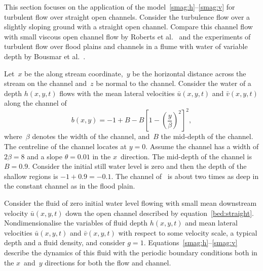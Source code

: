 \documentclass[a5paper,12pt]{article}
\newcommand{\uu}{{\bar u}}
\newcommand{\vv}{{\bar v}}
\begin{document}
This section focuses on the application of the model~\eqref{smag:h}--\eqref{smag:v} for turbulent flow over straight open channels. 
Consider the turbulence flow over a slightly sloping ground with a straight open channel. 
Compare this channel flow with small viscous open channel flow by Roberts et al.~\cite{Robertsli2006} and the experiments of turbulent flow over flood plains and channels in a flume with water of variable depth by Bousmar et al.~\cite{Bousmar2002,Bousmar2003a}. 
 
 Let~$x$ be the along stream coordinate,~$y$ be the horizontal distance across the stream on the channel and~$z$ be normal to the channel. 
Consider the water of a depth $h(x,y,t)$ flows with the mean lateral velocities $\uu(x,y,t)$ and $\vv(x,y,t)$ along the channel of
\begin{equation}
b(x,y)=-1+B-B\left[1-\left(\frac{y}{\beta}\right)^2\right]^2,\label{bed:straight}
\end{equation}
where~$\beta$ denotes the width of the channel, and~$B$ the mid-depth of the channel.  
The centreline of the channel locates at $y=0$.
Assume the channel has a width of  $2\beta=8$ and a slope $\theta=0.01$ in the $x$~direction.  
The mid-depth of the channel is $B=0.9$.
Consider the initial still water level is zero and then the depth of the shallow regions is $-1+0.9=-0.1$.
The channel of~\cite{Bousmar2002} is about two times as deep in the constant channel as in the flood plain.

Consider the fluid of zero initial water level flowing with small mean downstream velocity $\uu(x,y,t)$ down the open channel described by equation~\eqref{bed:straight}. 
Nondimensionalise the variables of fluid depth $h(x,y,t)$ and mean lateral velocities $\uu(x,y,t)$ and $\vv(x,y,t)$ with respect to some velocity scale, a typical depth and a fluid density, and consider $g=1$. 
Equations~\eqref{smag:h}--\eqref{smag:v} describe the dynamics of this fluid with the periodic boundary conditions both in the $x$~and~$y$ directions for both the flow and channel. 
\end{document}
